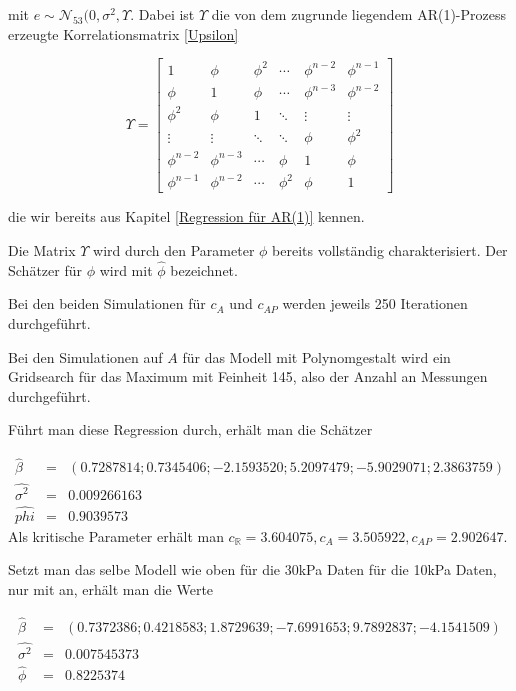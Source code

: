 \documentclass[12pt,a4paper]{article}
\theoremstyle{definition}
\theoremstyle{definition}
\theoremstyle{definition}
\theoremstyle{definition}
\begin{document}
mit $e \sim \mathscr{N}_{53}(0, \sigma^2, \Upsilon$. Dabei ist $\Upsilon$ die von dem zugrunde liegendem AR(1)-Prozess erzeugte Korrelationsmatrix \eqref{Upsilon}

\begin{equation*}
\Upsilon = 
\left[
   \begin{array}{cccccc}
     1 				& \phi 			& \phi^2	& \cdots	& \phi^{n-2}	& \phi^{n-1} 	\\
     \phi 			& 1		 		& \phi 		& \cdots	& \phi^{n-3}	& \phi^{n-2} 	\\
     \phi^2 		& \phi 			& 1		 	& \ddots	& \vdots		& \vdots 		\\
     \vdots		 	& \vdots	 	& \ddots	& \ddots	& \phi			& \phi^{2} 	\\
     \phi^{n-2} 	& \phi^{n-3}	& \cdots 	& \phi		& 1				& \phi 		\\
     \phi^{n-1} 	& \phi^{n-2} 	& \cdots	& \phi^{2}	& \phi			& 1  
   \end{array}
\right]
\end{equation*}

die wir bereits aus Kapitel \ref{Regression für AR(1)} kennen. 

Die Matrix $\Upsilon$ wird durch den Parameter $\phi$ bereits vollständig charakterisiert. Der Schätzer für $\phi$ wird mit $\hat{\phi}$ bezeichnet.

Bei den beiden Simulationen für $c_{A}$ und $c_{AP}$ werden jeweils 250 Iterationen durchgeführt.

Bei den Simulationen auf $A$ für das Modell mit Polynomgestalt wird ein Gridsearch für das Maximum mit Feinheit 145, also der Anzahl an Messungen durchgeführt.

Führt man diese Regression durch, erhält man die Schätzer 

\begin{eqnarray*}
\hat{\beta} &=& (0.7287814 ;  0.7345406 ; -2.1593520 ;  5.2097479 ; -5.9029071 ;  2.3863759) \\
\widehat{\sigma^2} &=& 0.009266163 \\
\hat{phi} &=& 0.9039573 
\end{eqnarray*}
Als kritische Parameter erhält man $c_{\mathbb{R}} = 3.604075, c_{A} = 3.505922, c_{AP} = 2.902647 $. 

Setzt man das selbe Modell wie oben für die 30kPa Daten für die 10kPa Daten, nur mit an, erhält man die Werte 

\begin{eqnarray*}
\hat{\beta} &=& (0.7372386;   0.4218583 ;  1.8729639 ; -7.6991653 ;  9.7892837 ; -4.1541509) \\
\widehat{\sigma^2} &=& 0.007545373 \\
\hat{\phi} &=& 0.8225374 
\end{eqnarray*}
\end{document}

